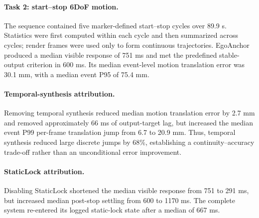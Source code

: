 \paragraph{Task 2: start--stop 6DoF motion.}
The sequence contained five marker-defined start--stop cycles over 89.9 s.
Statistics were first computed within each cycle and then summarized across cycles; render frames were used only to form continuous trajectories.
EgoAnchor produced a median visible response of 751 ms and met the predefined stable-output criterion in 600 ms.
Its median event-level motion translation error was 30.1 mm, with a median event P95 of 75.4 mm.

\paragraph{Temporal-synthesis attribution.}
Removing temporal synthesis reduced median motion translation error by 2.7 mm and removed approximately 66 ms of output-target lag, but increased the median event P99 per-frame translation jump from 6.7 to 20.9 mm.
Thus, temporal synthesis reduced large discrete jumps by 68\%, establishing a continuity--accuracy trade-off rather than an unconditional error improvement.

\paragraph{StaticLock attribution.}
Disabling StaticLock shortened the median visible response from 751 to 291 ms, but increased median post-stop settling from 600 to 1170 ms.
The complete system re-entered its logged static-lock state after a median of 667 ms.
